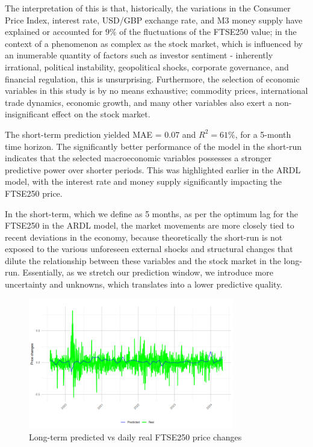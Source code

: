 \documentclass[12pt,a4paper]{article}
\begin{document}
The interpretation of this is that, historically, the variations in the 
Consumer Price Index, interest rate, USD/GBP exchange rate, and M3 money 
supply have explained or accounted for $9\%$ of the fluctuations of the
FTSE250 value; in the context of a phenomenon as complex as the stock market,
which is influenced by an inumerable quantity of factors such as investor sentiment
- inherently irrational, 
political instability, geopolitical shocks, corporate governance, and financial regulation, this is 
unsurprising. Furthermore, the selection of economic variables in this study
is by no means exhaustive; commodity prices, international trade dynamics,
economic growth, and many other variables also exert a non-insignificant 
effect on the stock market.


The short-term prediction yielded MAE = $0.07$ and 
$R^2 = 61\%$, for a 5-month time horizon.
The significantly better performance of the model in the short-run
indicates that the selected macroeconomic variables possesses
a stronger predictive power over shorter periods. This was highlighted 
earlier in the ARDL model, with the interest rate and money supply significantly
impacting the FTSE250 price. 

In the short-term, which we define as 5 months, 
as per the optimum lag for the FTSE250 in the ARDL model, the market movements
are more closely tied to recent deviations in the economy, because theoretically
the short-run is not exposed to the various unforeseen external shocks and structural changes
that dilute the relationship between these variables and the stock market in the 
long-run. Essentially, as we stretch our prediction window, we 
introduce more uncertainty and unknowns, which translates into a 
lower predictive quality.

\begin{figure}[h]
    \centering
    \includegraphics[width=0.8\textwidth]{long-term-daily.png}
    \caption{Long-term predicted vs daily real FTSE250 price changes}
    \label{fig:ldaily}
\end{figure}
\end{document}

